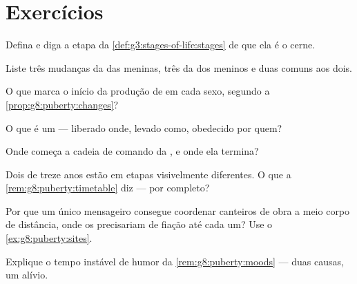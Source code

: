 \section{Exercícios}

\begin{exercise}[$\star$]\label{exo:g8:puberty:1}
Defina  e diga a etapa da
\cref{def:g3:stages-of-life:stages} de que ela é o cerne.
\end{exercise}

\begin{exercise}[$\star$]\label{exo:g8:puberty:2}
Liste três mudanças da  das meninas, três da dos meninos e
duas comuns aos dois.
\end{exercise}

\begin{exercise}[$\star$]\label{exo:g8:puberty:3}
O que marca o início da produção de  em cada sexo, segundo a
\cref{prop:g8:puberty:changes}?
\end{exercise}

\begin{exercise}[$\star$]\label{exo:g8:puberty:4}
O que é um  --- liberado onde, levado como, obedecido por quem?
\end{exercise}

\begin{exercise}[$\star$]\label{exo:g8:puberty:5}
Onde começa a cadeia de comando da , e onde ela termina?
\end{exercise}

\begin{exercise}[$\star$]\label{exo:g8:puberty:6}
Dois  de treze anos estão em etapas visivelmente
diferentes. O que a \cref{rem:g8:puberty:timetable} diz --- por
completo?
\end{exercise}

\begin{exercise}[$\star\star$]\label{exo:g8:puberty:7}
Por que um único mensageiro consegue coordenar canteiros de obra a
meio corpo de distância, onde os  precisariam de fiação até cada
um? Use o \cref{ex:g8:puberty:sites}.
\end{exercise}

\begin{exercise}[$\star\star$]\label{exo:g8:puberty:8}
Explique o tempo instável de humor da \cref{rem:g8:puberty:moods} ---
duas causas, um alívio.
\end{exercise}

